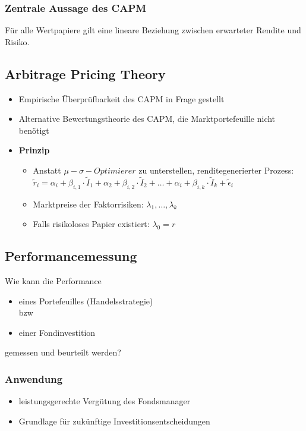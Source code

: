 \subsubsection{Zentrale Aussage des CAPM}
Für alle Wertpapiere gilt eine lineare Beziehung zwischen erwarteter Rendite und Risiko.


\subsection{Arbitrage Pricing Theory}
\begin{itemize}
	\item Empirische Überprüfbarkeit des CAPM in Frage gestellt
	\item Alternative Bewertungstheorie des CAPM, die Marktportefeuille nicht benötigt
	\item \textbf{Prinzip}
	\begin{itemize}
		\item Anstatt \(\mu - \sigma - Optimierer\) zu unterstellen, renditegenerierter Prozess: \(\tilde{r}_i = \alpha_i + \beta_{i,1} \cdot \tilde{I}_1 + \alpha_2 + \beta_{i,2} \cdot \tilde{I}_2 + \dots + \alpha_i + \beta_{i,k} \cdot \tilde{I}_k + \tilde{\epsilon}_i\)
		\item Marktpreise der Faktorrisiken: \(\lambda_1, \dots, \lambda_k\)
		\item Falls risikoloses Papier existiert: \(\lambda_0 = r\)
	\end{itemize}
\end{itemize}


\subsection{Performancemessung}
Wie kann die Performance
\begin{itemize}
	\item eines Portefeuilles (Handelsstrategie)\\
	bzw
	\item einer Fondinvestition
\end{itemize}
gemessen und beurteilt werden?

\subsubsection{Anwendung}
\begin{itemize}
	\item leistungsgerechte Vergütung des Fondsmanager
	\item Grundlage für zukünftige Investitionsentscheidungen
\end{itemize}

